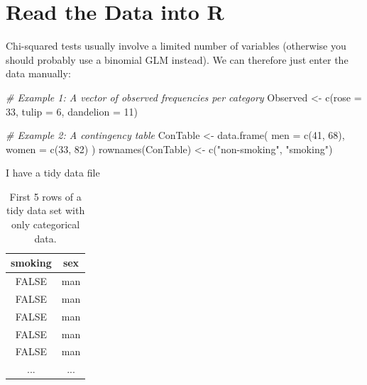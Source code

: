 \documentclass[
]{book}
\newenvironment{Shaded}{\begin{snugshade}}{\end{snugshade}}
\newcommand{\AttributeTok}[1]{\textcolor[rgb]{0.77,0.63,0.00}{#1}}
\newcommand{\CommentTok}[1]{\textcolor[rgb]{0.56,0.35,0.01}{\textit{#1}}}
\newcommand{\DecValTok}[1]{\textcolor[rgb]{0.00,0.00,0.81}{#1}}
\newcommand{\FunctionTok}[1]{\textcolor[rgb]{0.00,0.00,0.00}{#1}}
\newcommand{\NormalTok}[1]{#1}
\newcommand{\OtherTok}[1]{\textcolor[rgb]{0.56,0.35,0.01}{#1}}
\newcommand{\StringTok}[1]{\textcolor[rgb]{0.31,0.60,0.02}{#1}}
\begin{document}
\hypertarget{read-the-data-into-r}{%
\section{Read the Data into R}\label{read-the-data-into-r}}

Chi-squared tests usually involve a limited number of variables (otherwise you should probably use a binomial GLM instead). We can therefore just enter the data manually:

\begin{Shaded}
\begin{Highlighting}[]
\CommentTok{\# Example 1: A vector of observed frequencies per category}
\NormalTok{Observed }\OtherTok{\textless{}{-}} \FunctionTok{c}\NormalTok{(}\AttributeTok{rose =} \DecValTok{33}\NormalTok{, }\AttributeTok{tulip =} \DecValTok{6}\NormalTok{, }\AttributeTok{dandelion =} \DecValTok{11}\NormalTok{)}

\CommentTok{\# Example 2: A contingency table}
\NormalTok{ConTable }\OtherTok{\textless{}{-}} \FunctionTok{data.frame}\NormalTok{(}
  \AttributeTok{men   =} \FunctionTok{c}\NormalTok{(}\DecValTok{41}\NormalTok{, }\DecValTok{68}\NormalTok{),}
  \AttributeTok{women =} \FunctionTok{c}\NormalTok{(}\DecValTok{33}\NormalTok{, }\DecValTok{82}\NormalTok{) }
\NormalTok{)}
\FunctionTok{rownames}\NormalTok{(ConTable) }\OtherTok{\textless{}{-}} \FunctionTok{c}\NormalTok{(}\StringTok{"non{-}smoking"}\NormalTok{, }\StringTok{"smoking"}\NormalTok{)}
\end{Highlighting}
\end{Shaded}

I have a tidy data file

\begin{table}

\caption{\label{tab:unnamed-chunk-24}First 5 rows of a tidy data set with only categorical data.}
\centering
\fontsize{11}{13}\selectfont
\begin{tabular}[t]{c|c}
\hline
smoking & sex\\
\hline
FALSE & man\\
\hline
FALSE & man\\
\hline
FALSE & man\\
\hline
FALSE & man\\
\hline
FALSE & man\\
\hline
... & ...\\
\hline
\end{tabular}
\end{table}
\end{document}
